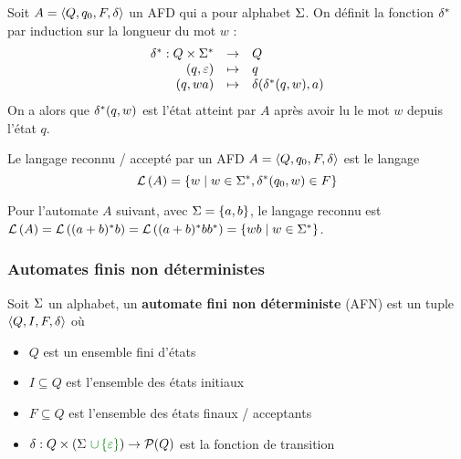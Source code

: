 \begin{definition}
	Soit $A = \langle Q, q_0, F, \delta \rangle$ un AFD qui a pour alphabet $\Sigma$. On définit la fonction $\delta^{*}$ par induction sur la longueur du mot $w$ :
	$$ \begin{array}{rcl}
			\delta^{*} : Q \times \Sigma^{*} & \to     & Q                               \\
			(q, \varepsilon)                   & \mapsto & q                               \\
			(q, wa)                         & \mapsto & \delta(\delta^{*}(q, w), a)
		\end{array} $$
	On a alors que $\delta^{*}(q, w)$ est l'état atteint par $A$ après avoir lu le mot $w$ depuis l'état $q$.
\end{definition}

\begin{definition}
	Le langage reconnu / accepté par un AFD $A = \langle Q, q_0, F, \delta \rangle$ est le langage
	$$ \mathcal{L}\left(A\right) = \left\{w \mid w \in \Sigma^{*}, \delta^{*}(q_0, w) \in F\right\} $$
\end{definition}

\begin{exemple}
	Pour l'automate $A$ suivant, avec $\Sigma = \left\{a,b\right\}$, le langage reconnu est $\mathcal{L}\left(A\right) = \mathcal{L}\left((a + b)^{*} b\right) = \mathcal{L}\left((a + b)^{*} b b^{*}\right) = \left\{wb \mid w \in \Sigma^{*}\right\}$.

	\begin{center}
	\end{center}
\end{exemple}

\subsubsection{Automates finis non déterministes }

\begin{definition}
	Soit $\Sigma$ un alphabet, un \textbf{automate fini non déterministe} (AFN) est un tuple $\langle Q, I, F, \delta \rangle$ où
	\begin{itemize}
		\item $Q$ est un ensemble fini d'états
		\item $I \subseteq Q$ est l'ensemble des états initiaux
		\item $F \subseteq Q$ est l'ensemble des états finaux / acceptants
		\item $\delta : Q \times (\Sigma \darkgreen {\ \cup \set\motvide}) \to \mathcal{P}(Q)$ est la fonction de transition
	\end{itemize}
\end{definition}


